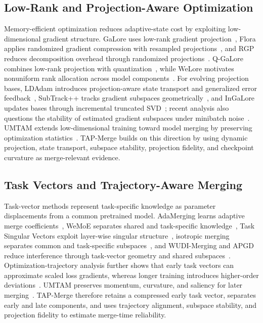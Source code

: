 \documentclass[fleqn,10pt]{wlscirep}
\begin{document}
\subsection{Low-Rank and Projection-Aware Optimization}
\label{subsec:rw_low_rank_optimization}

Memory-efficient optimization reduces adaptive-state cost by exploiting low-dimensional gradient structure. GaLore uses low-rank gradient projection~\cite{galore2024}, Flora applies randomized gradient compression with resampled projections~\cite{flora2024}, and RGP reduces decomposition overhead through randomized projections~\cite{rgp2024}. Q-GaLore combines low-rank projection with quantization~\cite{qgalore2025}, while WeLore motivates nonuniform rank allocation across model components~\cite{welore2025}. For evolving projection bases, LDAdam introduces projection-aware state transport and generalized error feedback~\cite{ldadam2025}, SubTrack++ tracks gradient subspaces geometrically~\cite{subtrackpp2025}, and InGaLore updates bases through incremental truncated SVD~\cite{ingalore2026}; recent analysis also questions the stability of estimated gradient subspaces under minibatch noise~\cite{nosubspace2026}. UMTAM extends low-dimensional training toward model merging by preserving optimization statistics~\cite{umtam2026}. TAP-Merge builds on this direction by using dynamic projection, state transport, subspace stability, projection fidelity, and checkpoint curvature as merge-relevant evidence.

\subsection{Task Vectors and Trajectory-Aware Merging}
\label{subsec:rw_task_vectors}

Task-vector methods represent task-specific knowledge as parameter displacements from a common pretrained model. AdaMerging learns adaptive merge coefficients~\cite{adamerging2024}, WeMoE separates shared and task-specific knowledge~\cite{wemoe2024}, Task Singular Vectors exploit layer-wise singular structure~\cite{tsvmerge2025}, isotropic merging separates common and task-specific subspaces~\cite{isotropicmerging2025}, and WUDI-Merging and APGD reduce interference through task-vector geometry and shared subspaces~\cite{wudi2025,apgdmerging2025}. Optimization-trajectory analysis further shows that early task vectors can approximate scaled loss gradients, whereas longer training introduces higher-order deviations~\cite{taskvectorsgradients2026}. UMTAM preserves momentum, curvature, and saliency for later merging~\cite{umtam2026}. TAP-Merge therefore retains a compressed early task vector, separates early and late components, and uses trajectory alignment, subspace stability, and projection fidelity to estimate merge-time reliability.
\end{document}
